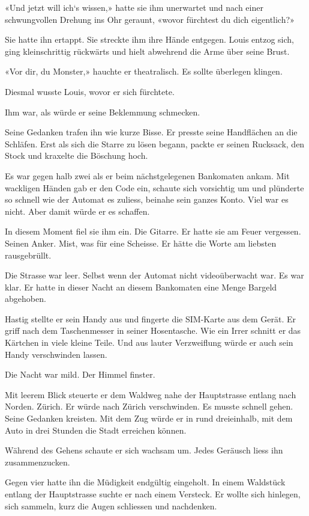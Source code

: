 «Und jetzt will ich`s wissen,» hatte sie ihm unerwartet und nach einer
schwungvollen Drehung ins Ohr geraunt, «wovor fürchtest du dich
eigentlich?»

Sie hatte ihn ertappt. Sie streckte ihm ihre Hände entgegen. Louis
entzog sich, ging kleinschrittig rückwärts und hielt abwehrend die Arme
über seine Brust.

«Vor dir, du Monster,» hauchte er theatralisch. Es sollte überlegen
klingen.

Diesmal wusste Louis, wovor er sich fürchtete.

Ihm war, als würde er seine Beklemmung schmecken.

Seine Gedanken trafen ihn wie kurze Bisse. Er presste seine Handflächen
an die Schläfen. Erst als sich die Starre zu lösen begann, packte er
seinen Rucksack, den Stock und kraxelte die Böschung hoch.

Es war gegen halb zwei als er beim nächstgelegenen Bankomaten ankam. Mit
wackligen Händen gab er den Code ein, schaute sich vorsichtig um und
plünderte so schnell wie der Automat es zuliess, beinahe sein ganzes
Konto. Viel war es nicht. Aber damit würde er es schaffen.

In diesem Moment fiel sie ihm ein. Die Gitarre. Er hatte sie am Feuer
vergessen. Seinen Anker. Mist, was für eine Scheisse. Er hätte die Worte
am liebsten rausgebrüllt.

Die Strasse war leer. Selbst wenn der Automat nicht videoüberwacht war.
Es war klar. Er hatte in dieser Nacht an diesem Bankomaten eine Menge
Bargeld abgehoben.

Hastig stellte er sein Handy aus und fingerte die SIM-Karte aus dem
Gerät. Er griff nach dem Taschenmesser in seiner Hosentasche. Wie ein
Irrer schnitt er das Kärtchen in viele kleine Teile. Und aus lauter
Verzweiflung würde er auch sein Handy verschwinden lassen.

Die Nacht war mild. Der Himmel finster.

Mit leerem Blick steuerte er dem Waldweg nahe der Hauptstrasse entlang
nach Norden. Zürich. Er würde nach Zürich verschwinden. Es musste
schnell gehen. Seine Gedanken kreisten. Mit dem Zug würde er in rund
dreieinhalb, mit dem Auto in drei Stunden die Stadt erreichen können.

Während des Gehens schaute er sich wachsam um. Jedes Geräusch liess ihn
zusammenzucken.

Gegen vier hatte ihn die Müdigkeit endgültig eingeholt. In einem
Waldstück entlang der Hauptstrasse suchte er nach einem Versteck. Er
wollte sich hinlegen, sich sammeln, kurz die Augen schliessen und
nachdenken.

